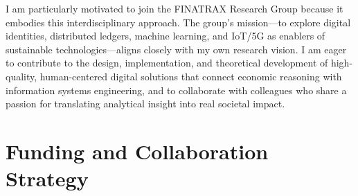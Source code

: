 \documentclass{nfr}
\begin{document}
I am particularly motivated to join the FINATRAX Research Group because it embodies this interdisciplinary approach. The group’s mission—to explore digital identities, distributed ledgers, machine learning, and IoT/5G as enablers of sustainable technologies—aligns closely with my own research vision. I am eager to contribute to the design, implementation, and theoretical development of high-quality, human-centered digital solutions that connect economic reasoning with information systems engineering, and to collaborate with colleagues who share a passion for translating analytical insight into real societal impact.







\section*{Funding and Collaboration Strategy}
\end{document}
